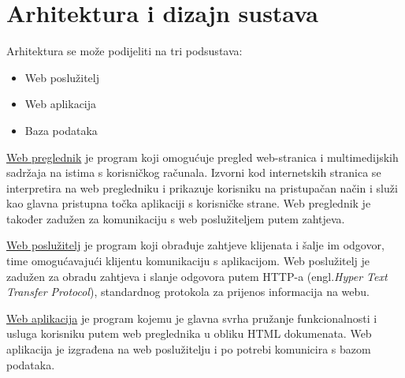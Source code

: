 \chapter{Arhitektura i dizajn sustava}
	Arhitektura se može podijeliti na tri podsustava:
	\begin{itemize}
		\item Web poslužitelj
		\item Web aplikacija
		\item Baza podataka
	\end{itemize}

	\underline{Web preglednik} je program koji omogućuje pregled web-stranica i multimedijskih sadržaja na istima s korisničkog računala. Izvorni kod internetskih stranica se interpretira na web pregledniku i prikazuje korisniku na pristupačan način i služi kao glavna pristupna točka aplikaciji s korisničke strane. Web preglednik je također zadužen za komunikaciju s web poslužiteljem putem zahtjeva.
	
	\underline{Web poslužitelj} je program koji obrađuje zahtjeve klijenata i šalje im odgovor, time omogućavajući klijentu komunikaciju s aplikacijom. Web poslužitelj je zadužen za obradu zahtjeva i slanje odgovora putem HTTP-a (engl.\textit{Hyper Text Transfer Protocol}), standardnog protokola za prijenos informacija na webu.
	
	\underline{Web aplikacija} je program kojemu je glavna svrha pružanje funkcionalnosti i usluga korisniku putem web preglednika u obliku HTML dokumenata. Web aplikacija je izgrađena na web poslužitelju i po potrebi komunicira s bazom podataka.
	
